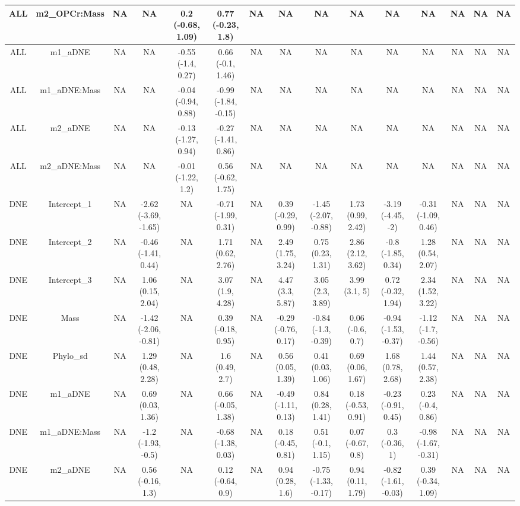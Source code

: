 \begin{longtable}[t]{c|c|c|c|c|c|c|c|c|c|c|c|c|c|c}
\hline
ALL & m2_OPCr:Mass & NA & NA & 0.2 (-0.68, 1.09) & 0.77 (-0.23, 1.8) & NA & NA & NA & NA & NA & NA & NA & NA & NA\\
\hline
ALL & m1_aDNE & NA & NA & -0.55 (-1.4, 0.27) & 0.66 (-0.1, 1.46) & NA & NA & NA & NA & NA & NA & NA & NA & NA\\
\hline
ALL & m1_aDNE:Mass & NA & NA & -0.04 (-0.94, 0.88) & -0.99 (-1.84, -0.15) & NA & NA & NA & NA & NA & NA & NA & NA & NA\\
\hline
ALL & m2_aDNE & NA & NA & -0.13 (-1.27, 0.94) & -0.27 (-1.41, 0.86) & NA & NA & NA & NA & NA & NA & NA & NA & NA\\
\hline
ALL & m2_aDNE:Mass & NA & NA & -0.01 (-1.22, 1.2) & 0.56 (-0.62, 1.75) & NA & NA & NA & NA & NA & NA & NA & NA & NA\\
\hline
DNE & Intercept_1 & NA & -2.62 (-3.69, -1.65) & NA & -0.71 (-1.99, 0.31) & NA & 0.39 (-0.29, 0.99) & -1.45 (-2.07, -0.88) & 1.73 (0.99, 2.42) & -3.19 (-4.45, -2) & -0.31 (-1.09, 0.46) & NA & NA & NA\\
\hline
DNE & Intercept_2 & NA & -0.46 (-1.41, 0.44) & NA & 1.71 (0.62, 2.76) & NA & 2.49 (1.75, 3.24) & 0.75 (0.23, 1.31) & 2.86 (2.12, 3.62) & -0.8 (-1.85, 0.34) & 1.28 (0.54, 2.07) & NA & NA & NA\\
\hline
DNE & Intercept_3 & NA & 1.06 (0.15, 2.04) & NA & 3.07 (1.9, 4.28) & NA & 4.47 (3.3, 5.87) & 3.05 (2.3, 3.89) & 3.99 (3.1, 5) & 0.72 (-0.32, 1.94) & 2.34 (1.52, 3.22) & NA & NA & NA\\
\hline
DNE & Mass & NA & -1.42 (-2.06, -0.81) & NA & 0.39 (-0.18, 0.95) & NA & -0.29 (-0.76, 0.17) & -0.84 (-1.3, -0.39) & 0.06 (-0.6, 0.7) & -0.94 (-1.53, -0.37) & -1.12 (-1.7, -0.56) & NA & NA & NA\\
\hline
DNE & Phylo_sd & NA & 1.29 (0.48, 2.28) & NA & 1.6 (0.49, 2.7) & NA & 0.56 (0.05, 1.39) & 0.41 (0.03, 1.06) & 0.69 (0.06, 1.67) & 1.68 (0.78, 2.68) & 1.44 (0.57, 2.38) & NA & NA & NA\\
\hline
DNE & m1_aDNE & NA & 0.69 (0.03, 1.36) & NA & 0.66 (-0.05, 1.38) & NA & -0.49 (-1.11, 0.13) & 0.84 (0.28, 1.41) & 0.18 (-0.53, 0.91) & -0.23 (-0.91, 0.45) & 0.23 (-0.4, 0.86) & NA & NA & NA\\
\hline
DNE & m1_aDNE:Mass & NA & -1.2 (-1.93, -0.5) & NA & -0.68 (-1.38, 0.03) & NA & 0.18 (-0.45, 0.81) & 0.51 (-0.1, 1.15) & 0.07 (-0.67, 0.8) & 0.3 (-0.36, 1) & -0.98 (-1.67, -0.31) & NA & NA & NA\\
\hline
DNE & m2_aDNE & NA & 0.56 (-0.16, 1.3) & NA & 0.12 (-0.64, 0.9) & NA & 0.94 (0.28, 1.6) & -0.75 (-1.33, -0.17) & 0.94 (0.11, 1.79) & -0.82 (-1.61, -0.03) & 0.39 (-0.34, 1.09) & NA & NA & NA\\

\end{longtable}
